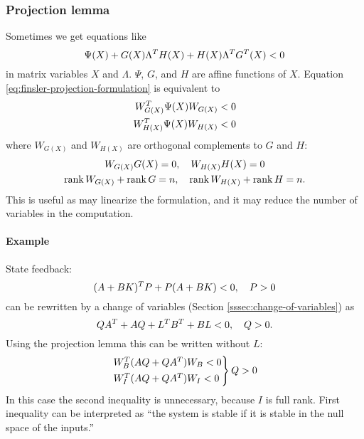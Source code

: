 \subsubsection{Projection lemma}
Sometimes we get equations like
%
\begin{equation}\label{eq:finsler-projection-formulation}
  \Psi(X) + G(X)\Lambda^{T} H(X) + H(X)\Lambda^{T} G^{T}(X) < 0
\end{equation}
%
in matrix variables $X$ and $\Lambda$. $\Psi$, $G$, and $H$ are affine functions of $X$. Equation \eqref{eq:finsler-projection-formulation} is equivalent to
%
\begin{equation}
  \begin{split}
    W_{G(X)}^{T} \Psi(X) W_{G(X)} &< 0 \\
    W_{H(X)}^{T} \Psi(X) W_{H(X)} &< 0
  \end{split}
\end{equation}
%
where $W_{G(X)}$ and $W_{H(X)}$ are orthogonal complements to $G$ and $H$:
\begin{gather}
  W_{G(X)} G(X) = 0,\quad W_{H(X)} H(X) = 0 \\
  \operatorname{rank} W_{G(X)} + \operatorname{rank} G = n,\quad \operatorname{rank} W_{H(X)} + \operatorname{rank} H = n.
\end{gather}
%
This is useful as may linearize the formulation, and it may reduce the number of variables in the computation.

\paragraph{Example} State feedback:
%
\begin{equation}
  (A + BK)^{T} P + P(A + BK) < 0,\quad P > 0
\end{equation}
%
can be rewritten by a change of variables (Section \ref{sssec:change-of-variables}) as
%
\begin{equation}
  QA^{T} + AQ + L^{T} B^{T} + BL < 0,\quad Q > 0.
\end{equation}
%
Using the projection lemma this can be written without $L$:
%
\begin{equation}
  \begin{rcases}
    W_B^{T}(AQ+QA^{T})W_B < 0 \\
    W_I^{T}(AQ+QA^{T})W_I < 0
  \end{rcases} Q > 0
\end{equation}
%
In this case the second inequality is unnecessary, because $I$ is full rank. First inequality can be interpreted as ``the system is stable if it is stable in the null space of the inputs.''

